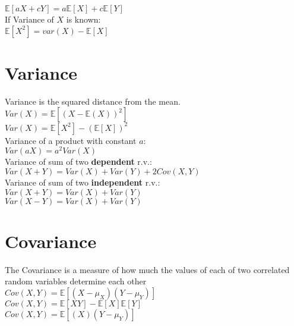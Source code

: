 $\mathbb{E}[aX + c Y] = a\mathbb{E}[X] + c\mathbb{E}[Y]$\\

If Variance of $X$ is known:\\

$\mathbb{E}[X^2] = var(X) - \mathbb{E}[X]$\\


\section{Variance}

Variance is the squared distance from the mean.\\

$Var(X)=\mathbb{E}[(X-\mathbb{E}(X))^2]$\\

$Var\left(X\right)=\mathbb{E}\left[X^2\right]-\left(\mathbb{E}\left[X\right]\right)^2$\\

Variance of a product with constant $a$:\\

$Var(aX)=a^2 Var\left(X\right)$\\

Variance of sum of two \textbf{dependent} r.v.:\\

$Var(X + Y)=Var(X)+Var(Y)+2Cov(X,Y)$\\

Variance of sum of two \textbf{independent} r.v.:\\

$Var(X + Y)=Var(X)+Var(Y)$\\

$Var(X - Y)=Var(X)+Var(Y)$\\

\section{Covariance}

The Covariance is a measure of how much the values of each of two correlated random variables determine each other\\

$Cov(X,Y) = \mathbb E[(X - \mu _ X)(Y - \mu _ Y)]$ \\

$Cov(X,Y) = \mathbb E[XY] - \mathbb E[X]\mathbb E[Y] $\\

$ Cov(X,Y)= \displaystyle  \mathbb E[(X)(Y-\mu _ Y)]$\\

